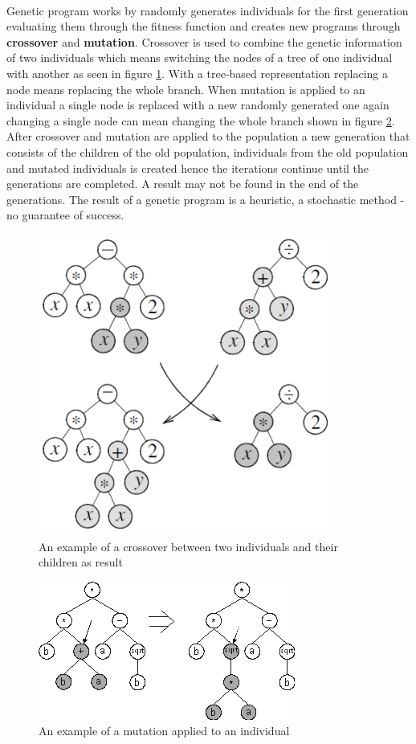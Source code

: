 \paragraph{}
Genetic program works by randomly generates individuals for the first generation evaluating them through the 
fitness function and creates new programs through \textbf{crossover} and \textbf{mutation}. Crossover 
is used to combine the genetic information of two individuals which means switching the nodes of a tree of one individual
with another as seen in figure \ref{fig:cross}. With a tree-based representation replacing a node means replacing the whole branch. When mutation
is applied to an individual a single node is replaced with a new randomly generated one again changing a single
node can mean changing the whole branch shown in figure \ref{fig:mut}. After crossover and mutation are applied to the population a new generation
that consists of the children of the old population, individuals from the old population and mutated individuals is created
hence the iterations continue until the generations are completed. A result may not be found in the end of the generations.
The result of a genetic program is a heuristic, a stochastic method - no guarantee of success.
\begin{figure}[htp]
\centering
\includegraphics[scale=0.8]{Figures/crossover.png}
\caption{An example of a crossover between two individuals and their children as result}
\label{fig:cross}
\end{figure}

\begin{figure}[htp]
\centering
\includegraphics[scale=1.2]{Figures/mutation.png}
\caption{An example of a mutation applied to an individual}
\label{fig:mut}
\end{figure}

